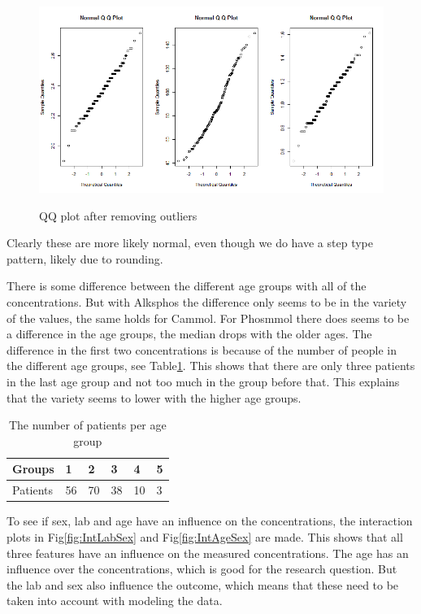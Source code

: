 \documentclass{article}
\begin{document}
	\begin{figure}[H]
		\centering
		{\includegraphics[scale=0.3]{../results/dat2_qq.png}}
		\caption{QQ plot after removing outliers}
		\label{fig:qq2}
	\end{figure}
	
	Clearly these are more likely normal, even though we do have a step type pattern, likely due to rounding.
	
      There is some difference between the different age groups with all of the concentrations.
      But with Alksphos the difference only seems to be in the variety of the values, the same holds for Cammol.
      For Phosmmol there does seems to be a difference in the age groups, the median drops with the older ages.
      The difference in the first two concentrations is because of the number of people in the different age groups, see Table\ref{table:Agegrp}.
      This shows that there are only three patients in the last age group and not too much in the group before that.
      This explains that the variety seems to lower with the higher age groups.
      
      \begin{table}[H]
        \begin{center}
          \begin{tabular}{|l|lllll|}
          \hline
          Groups&1&2&3&4&5\\
          \hline
          Patients&56&70&38&10&3\\
          \hline
          \end{tabular}
        \end{center}
        \caption{The number of patients per age group}
        \label{table:Agegrp}
      \end{table}

      To see if sex, lab and age have an influence on the concentrations, the interaction plots in Fig\ref{fig:IntLabSex} and Fig\ref{fig:IntAgeSex} are made.
      This shows that all three features have an influence on the measured concentrations.
      The age has an influence over the concentrations, which is good for the research question. 
      But the lab and sex also influence the outcome, which means that these need to be taken into account with modeling the data.
\end{document}
